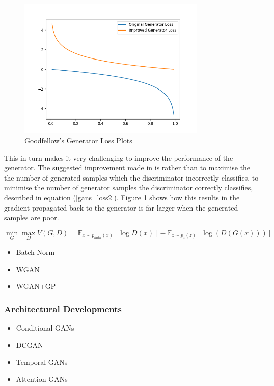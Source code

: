 \documentclass[12pt]{article}
\begin{document}
\begin{figure}[h]
    \centering
        \includegraphics[width=0.8\textwidth]{../figures/goodfellow_gen_losses.png}
    \caption{Goodfellow's Generator Loss Plots \cite{Goodfellow2014}}\label{fig:Goodfellow_plot}
\end{figure}

\noindent This in turn makes it very challenging to improve the performance of the generator.
The suggested improvement made in \cite{Goodfellow2014} is rather than to maximise the the number of generated samples which the discriminator incorrectly classifies, to minimise the number of generator samples the discriminator correctly classifies, described in equation (\ref{gans_loss2}).
Figure \ref{fig:Goodfellow_plot} shows how this results in the gradient propagated back to the generator is far larger when the generated samples are poor.

\begin{equation} \label{gans_loss2}
    \min_{G} \max_{D} V(G, D) = \mathbb{E}_{x \sim p_{data}(x)} [\log D(x)]
                              - \mathbb{E}_{z \sim p_{z}(z)} [\log (D(G(x)))]
\end{equation}

\begin{itemize}
    \item Batch Norm
    \item WGAN
    \item WGAN+GP
\end{itemize}


\subsubsection{Architectural Developments}
\begin{itemize}
    \item Conditional GANs
    \item DCGAN
    \item Temporal GANs
    \item Attention GANs
\end{itemize}
\end{document}

